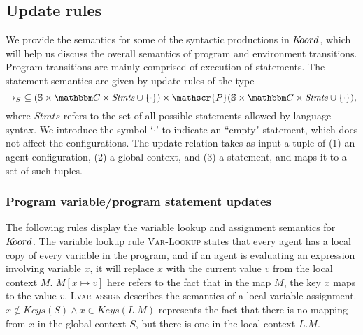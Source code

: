 \subsection{Update rules}
We provide the semantics for some of the syntactic productions in $K\kern-2pt oord$, which will help us discuss the overall semantics of program and environment transitions. Program transitions are mainly comprised of execution of statements. The statement semantics are given by update rules of the type
$$\stmtrule\ \subseteq (\pws \times \pwl\times \mathit{Stmts} \cup \{\cdot\}) \times \mathscr{P}(\pws\times \pwl \times \mathit{Stmts} \cup \{\cdot\}),$$
where $\mathit{Stmts}$ refers to the set of all possible statements allowed by language syntax. We introduce the symbol `$\cdot$' to indicate an ``empty" statement, which does not affect the configurations. The update relation takes as input a tuple of (1) an agent configuration, (2) a global context, and (3) a statement, and maps it to a set of such tuples. 
\subsubsection{Program variable/program statement updates}

The following rules display the variable lookup and assignment semantics for $K\kern-2pt oord$. The variable lookup rule \textsc{Var-Lookup} states that every agent has a local copy of every variable in the program, and if an agent is evaluating an expression involving variable $x$, it will replace $x$ with the current value $v$ from the local context $M$. $M[x\mapsto v]$ here refers to the fact that in the map $M$, the key $x$ maps to the value $v$. \textsc{Lvar-assign} describes the semantics of a local variable assignment. $x\notin \mathit{Keys}(S) \wedge x \in \mathit{Keys(L.M)}$ represents the fact that there is no mapping from $x$ in the global context $S$, but there is one in the local context $L.M$. 

\begin{mdframed}
\scriptsize
{}
\end{mdframed}

